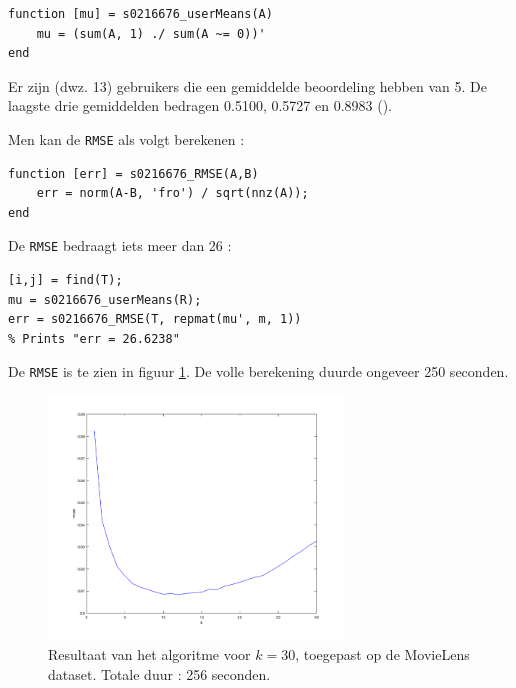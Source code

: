 \begin{lstlisting}
function [mu] = s0216676_userMeans(A)
    mu = (sum(A, 1) ./ sum(A ~= 0))'
end
\end{lstlisting}



Er zijn  (dwz. 13) gebruikers die een gemiddelde beoordeling hebben van 5. De laagste drie gemiddelden bedragen 0.5100, 0.5727 en 0.8983 ().



Men kan de \texttt{RMSE} als volgt berekenen :

\begin{lstlisting}
function [err] = s0216676_RMSE(A,B)
    err = norm(A-B, 'fro') / sqrt(nnz(A));
end
\end{lstlisting}



De \texttt{RMSE} bedraagt iets meer dan 26 :

\begin{lstlisting}
[i,j] = find(T);
mu = s0216676_userMeans(R);
err = s0216676_RMSE(T, repmat(mu', m, 1)) 
% Prints "err = 26.6238"
\end{lstlisting}



De \texttt{RMSE} is te zien in figuur \ref{fig:op12}. De volle berekening duurde ongeveer 250 seconden.

\begin{figure}[H]
\centering
\includegraphics[width=0.7\textwidth]{res/op12.png}
\caption{Resultaat van het algoritme voor $k=30$, toegepast op de MovieLens dataset. Totale duur : 256 seconden.}
\label{fig:op12}
\end{figure}

